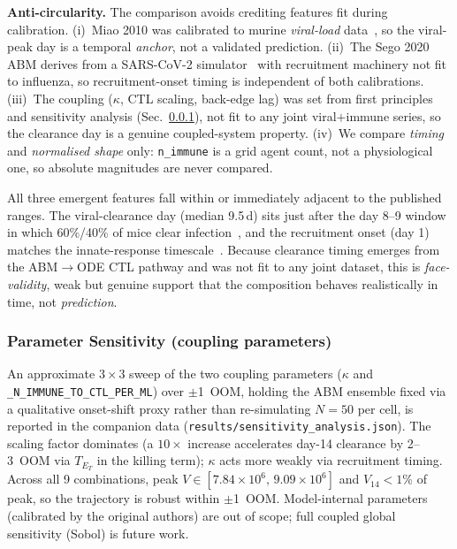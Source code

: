 \documentclass[conference,letterpaper,10pt]{IEEEtran}
\begin{document}
\textbf{Anti-circularity.} The comparison avoids crediting features fit
during calibration. (i)~Miao 2010 was calibrated to murine
\emph{viral-load} data~\cite{miao2010influenza}, so the viral-peak day is a
temporal \emph{anchor}, not a validated prediction. (ii)~The Sego 2020 ABM
derives from a SARS-CoV-2 simulator~\cite{getz2020sarscov2} with
recruitment machinery not fit to influenza, so recruitment-onset timing is
independent of both calibrations. (iii)~The coupling ($\kappa$, CTL
scaling, back-edge lag) was set from first principles and sensitivity
analysis (Sec.~\ref{sec:valid-sens}), not fit to any joint viral$+$immune
series, so the clearance day is a genuine coupled-system property. (iv)~We
compare \emph{timing} and \emph{normalised shape} only: \texttt{n\_immune}
is a grid agent count, not a physiological one, so absolute magnitudes are
never compared.

All three emergent features fall within or immediately adjacent to the
published ranges. The viral-clearance day (median 9.5\,d) sits just after
the day 8--9 window in which 60\%/40\% of mice clear
infection~\cite{myers2021influenza}, and the recruitment onset (day 1)
matches the innate-response
timescale~\cite{lv2014kinetics,iwasaki2010innate}. Because clearance
timing emerges from the ABM$\to$ODE CTL pathway and was not fit to any
joint dataset, this is \emph{face-validity}, weak but genuine support
that the composition behaves realistically in time, not
\emph{prediction}.

\subsubsection{Parameter Sensitivity (coupling parameters)}
\label{sec:valid-sens}
An approximate $3\!\times\!3$ sweep of the two coupling parameters
($\kappa$ and \texttt{\_N\_IMMUNE\_TO\_CTL\_PER\_ML}) over $\pm$1~OOM,
holding the ABM ensemble fixed via a qualitative onset-shift proxy rather
than re-simulating $N\!=\!50$ per cell, is reported in the companion data
(\texttt{results/sensitivity\_analysis.json}). The scaling factor dominates (a $10\times$ increase accelerates day-14
clearance by 2--3~OOM via $T_{E_T}$ in the killing term); $\kappa$ acts more
weakly via recruitment timing. Across all 9 combinations, peak
$V \in [7.84{\times}10^{6},\,9.09{\times}10^{6}]$ and $V_{14}\!<\!1\%$ of
peak, so the trajectory is robust within $\pm$1~OOM. Model-internal
parameters (calibrated by the original authors) are out of scope; full
coupled global sensitivity (Sobol) is future work.
\end{document}

